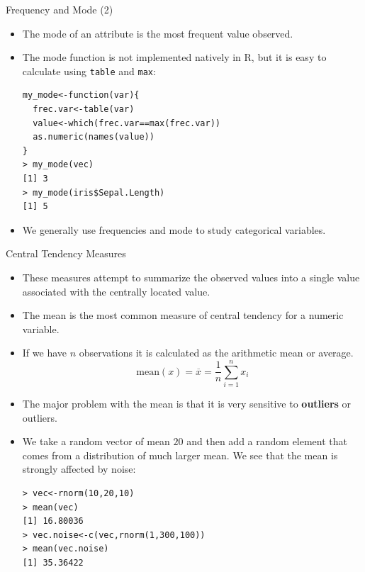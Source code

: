 \documentclass[handout]{beamer}
\begin{document}
\begin{frame}[fragile]{Frequency and Mode (2)}
\scriptsize{
\begin{itemize}
 \item The mode of an attribute is the most frequent value observed.
 \item The mode function is not implemented natively in R, but it is easy to calculate using \verb+table+ and \verb+max+:
 \begin{verbatim}
my_mode<-function(var){
  frec.var<-table(var)
  value<-which(frec.var==max(frec.var))
  as.numeric(names(value))
}
> my_mode(vec)
[1] 3
> my_mode(iris$Sepal.Length)
[1] 5
 \end{verbatim}
 
\item We generally use frequencies and mode to study categorical variables.

\end{itemize}
 

 }
\end{frame}


\begin{frame}[fragile]{Central Tendency Measures}
\scriptsize{
\begin{itemize}
 \item These measures attempt to summarize the observed values into a single value associated with the centrally located value.
 \item The mean is the most common measure of central tendency for a numeric variable.  
 \item If we have $n$ observations it is calculated as the arithmetic mean or average.
 \begin{displaymath}
   \text{mean}(x) = \overline{x} = \frac{1}{n} \sum_{i=1}^{n} x_i
 \end{displaymath}

 \item The major problem with the mean is that it is very sensitive to \textbf{outliers} or outliers.
 
 \item We take a random vector of mean $20$ and then add a random element that comes from a distribution of much larger mean.  We see that the mean is strongly affected by noise:
 \begin{verbatim}
> vec<-rnorm(10,20,10)
> mean(vec)
[1] 16.80036
> vec.noise<-c(vec,rnorm(1,300,100))
> mean(vec.noise)
[1] 35.36422
 \end{verbatim}

 
\end{itemize}

 
}
 
\end{frame}
\end{document}
